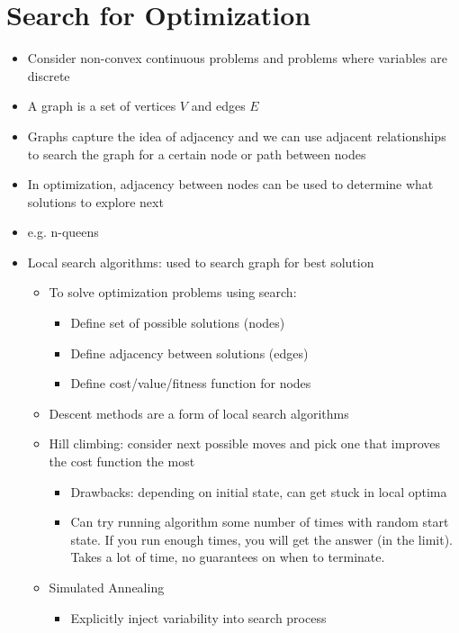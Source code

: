 \documentclass[../main.tex]{subfiles}
\begin{document}
    \section{Search for Optimization}
    \begin{itemize}
        \item Consider non-convex continuous problems and problems where variables are discrete
        \item A graph is a set of vertices $V$ and edges $E$
        \item Graphs capture the idea of adjacency and we can use adjacent relationships to search the graph for a certain node or path between nodes
        \item In optimization, adjacency between nodes can be used to determine what solutions to explore next
        \item e.g. n-queens
        \item Local search algorithms: used to search graph for best solution
        \begin{itemize}
            \item To solve optimization problems using search:
            \begin{itemize}
                \item Define set of possible solutions (nodes)
                \item Define adjacency between solutions (edges)
                \item Define cost/value/fitness function for nodes
            \end{itemize}
            \item Descent methods are a form of local search algorithms
            \item Hill climbing: consider next possible moves and pick one that improves the cost function the most
            \begin{itemize}
                \item Drawbacks: depending on initial state, can get stuck in local optima
                \item Can try running algorithm some number of times with random start state. If you run enough times, you will get the answer (in the limit). Takes a lot of time, no guarantees on when to terminate.
            \end{itemize}
            \item Simulated Annealing
            \begin{itemize}
                \item Explicitly inject variability into search process

\end{itemize}
\end{itemize}
\end{itemize}
\end{document}
